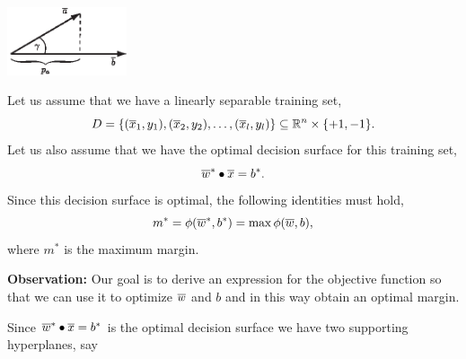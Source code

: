 \documentclass[a4paper,blends,pdf,colorBG,slideColor]{prosper}
\begin{document}
\es


\vspace{.5in}
\begin{center}
\includegraphics[height=20mm]{figures/fig06-04.eps}
\end{center}

\es


Let us assume that we have a linearly separable training set,
\begin{equation*}
D = \{(\overline{x}_1,y_1),(\overline{x}_2,y_2),\ldots,(\overline{x}_l,y_l)\} \subseteq
	\mathbb{R}^{n} \times \{+1,-1\}.
\end{equation*}
Let us also assume that we have the optimal decision surface for this training set,
\begin{equation*}
\overline{w}^*\bullet\overline{x} = b^*.
\end{equation*}
Since this decision surface is optimal, the following identities must hold,
\begin{equation*}
m^* = \phi(\overline{w}^*, b^*) = \max\phi(\overline{w},b),
\end{equation*}
where $m^*$ is the maximum margin.

\vspace{.2in}
{\bf Observation:} Our goal is to derive an expression for the objective function so that we can use it
to optimize $\overline{w}$ and $b$ and in this way obtain an optimal margin.
\es



Since $\overline{w}^*\bullet\overline{x} = b^*$ is the optimal decision surface we have two supporting 
hyperplanes, say
\end{document}
